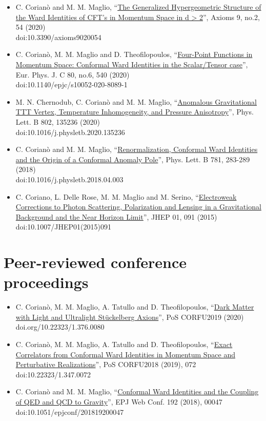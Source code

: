 \documentclass[a4paper,11pt,openright,twoside]{book}
\numberwithin{equation}{section}
\begin{document}
\begin{itemize}
	\item C. Corianò and M. M. Maglio, “\href{https://doi.org/10.3390/axioms9020054}{The Generalized Hypergeometric Structure of the Ward Identities of CFT's in Momentum Space in d > 2}”, Axioms 9, no.2, 54 (2020)\\ doi:10.3390/axioms9020054 
	\item 	C. Corianò, M. M. Maglio and D. Theofilopoulos, “\href{https://doi.org/10.1140/epjc/s10052-020-8089-1}{Four-Point Functions in Momentum Space: Conformal Ward Identities in the Scalar/Tensor case}”, Eur. Phys. J. C 80, no.6, 540 (2020) \\doi:10.1140/epjc/s10052-020-8089-1 
	\item M. N. Chernodub, C. Corianò and M. M. Maglio, “\href{https://doi.org/10.1016/j.physletb.2020.135236}{Anomalous Gravitational TTT Vertex, Temperature Inhomogeneity, and Pressure Anisotropy}”, Phys. Lett. B 802, 135236 (2020) \\  
	doi:10.1016/j.physletb.2020.135236 
	\item 	C. Corianò and M. M. Maglio, “\href{https://doi.org/10.1016/j.physletb.2018.04.003}{Renormalization, Conformal Ward Identities and the Origin of a Conformal Anomaly Pole}”, Phys. Lett. B 781, 283-289 (2018)  \\doi:10.1016/j.physletb.2018.04.003 
	\item 	C. Coriano, L. Delle Rose, M. M. Maglio and M. Serino, “\href{https://doi.org/10.1007/JHEP01(2015)091}{Electroweak Corrections to Photon Scattering, Polarization and Lensing in a Gravitational Background and the Near Horizon Limit}”, JHEP 01, 091 (2015)  doi:10.1007/JHEP01(2015)091  
\end{itemize}
\section*{Peer-reviewed conference proceedings }
\begin{itemize}
	\item C. Corianò, M. M. Maglio, A. Tatullo and D. Theofilopoulos, “\href{https://doi.org/10.22323/1.376.0080}{Dark Matter with Light and Ultralight Stückelberg Axions}”, PoS CORFU2019 (2020)  
	doi.org/10.22323/1.376.0080 
	\item C. Corianò, M. M. Maglio, A. Tatullo and D. Theofilopoulos, “\href{https://doi.org/10.22323/1.347.0072}{Exact Correlators from Conformal Ward Identities in Momentum Space and Perturbative Realizations}”, PoS CORFU2018 (2019), 072\\doi:10.22323/1.347.0072 
	\item C. Corianò and M. M. Maglio, “\href{https://doi.org/10.1051/epjconf/201819200047}{Conformal Ward Identities and the Coupling of QED and QCD to Gravity}”, EPJ Web Conf. 192 (2018), 00047 doi:10.1051/epjconf/201819200047 
\end{itemize}	
\end{document}
